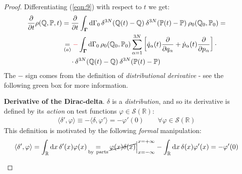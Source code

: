 \documentclass[../../main.tex]{subfiles}
\begin{document}
\begin{proof}
    \medskip

    Differentiating (\ref{eqn:9}) with respect to $t$ we get:
    \begin{align}\nonumber
        \pdv{t} \rho(\mathbb{Q},\mathbb{P},t) &= \pdv{t} \int_{\bm{\Gamma}} \dd{\Gamma_0} \delta^{3N}(\mathbb{Q}(t)-\mathbb{Q}) \> \delta^{3N}(\mathbb{P}(t)-\mathbb{P}) \> \rho_0(\mathbb{Q}_0,\mathbb{P}_0) =\\ \nonumber
        &\underset{(a)}{=}  \textcolor{Red}{-} \int_{\bm{\Gamma}} \dd{\Gamma_0} \rho_0(\mathbb{Q}_0, \mathbb{P}_0) \sum_{\alpha=1}^{3N} \left[\dot{q}_\alpha(t) \pdv{q_\alpha} + \dot{p}_\alpha(t) \pdv{p_\alpha}\right] \cdot  \\
        &\quad\> \cdot \delta^{3N}(\mathbb{Q}(t) - \mathbb{Q}) \> \delta^{3N}(\mathbb{P}(t) - \mathbb{P}) \label{eqn:10}
    \end{align}
    The $-$ sign comes from the definition of \textit{distributional derivative} - see the following green box for more information. 

    \begin{expl}\textbf{Derivative of the Dirac-delta}. 
    $\delta$ is a \textit{distribution}, and so its derivative is defined by its \textit{action} on test functions $\varphi \in \mathcal{S}(\mathbb{R})$:
    \begin{align*}
        \langle \delta', \varphi \rangle \equiv - \langle \delta, \varphi' \rangle = -\varphi'(0) \qquad \forall \varphi \in \mathcal{S}(\mathbb{R})
    \end{align*}  
    This definition is motivated by the following \textit{formal} manipulation:
    \begin{align*}
        \langle \delta', \varphi \rangle = \int_{\mathbb{R}} \dd{x} \delta'(x) \varphi(x) \quad\underset{\mathclap{\rm{by\ parts}}}{=}\quad \cancel{ \varphi(x) \delta(x) }\Big|_{x=-\infty}^{x=+\infty} - \int_{\mathbb{R}} \dd{x} \delta(x)  \varphi'(x) = -\varphi'(0)
    \end{align*} 


\end{expl}
\end{proof}
\end{document}

